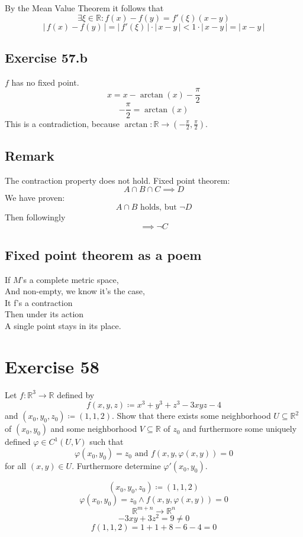 \documentclass[a4paper]{article}
\theoremstyle{definition}
\newcommand\abs[1]{\left|\,#1\,\right|}
\begin{document}
By the Mean Value Theorem it follows that
\[ \exists \xi \in \mathbb R: f(x) - f(y) = f'(\xi) (x - y) \]
\[ \abs{f(x) - f(y)} = \abs{f'(\xi)} \cdot \abs{x - y} < 1 \cdot \abs{x - y} = \abs{x - y} \]

\subsection{Exercise 57.b}

$f$ has no fixed point.
\[ x = x - \arctan(x) - \frac\pi2 \]
\[ -\frac\pi2 = \arctan(x) \]
This is a contradiction, because $\arctan: \mathbb R \to (-\frac{\pi}{2}, \frac\pi2)$.

\subsection{Remark}
%
The contraction property does not hold. Fixed point theorem:
\[ A \cap B \cap C \implies D \]
We have proven:
\[ A \cap B \text{ holds, but } \neg D \]
Then followingly
\[ \implies \neg C \]

\subsection{Fixed point theorem as a poem}

If $M$'s a complete metric space, \\
And non-empty, we know it's the case, \\
It f's a contraction \\
Then under its action \\
A single point stays in its place.

\section{Exercise 58}
\begin{ex}
  Let $f: \mathbb R^3 \to \mathbb R$ defined by
  \[ f(x, y, z) \coloneqq x^3 + y^3 + z^3 - 3xyz - 4 \]
  and $(x_0, y_0, z_0) \coloneqq (1, 1, 2)$. Show that there exists some neighborhood
  $U \subseteq \mathbb R^2$ of $(x_0, y_0)$ and some neighborhood $V \subseteq \mathbb R$
  of $z_0$ and furthermore some uniquely defined $\varphi \in C^1(U, V)$ such that
  \[ \varphi(x_0, y_0) = z_0 \text{ and } f(x, y, \varphi(x, y)) = 0 \]
  for all $(x, y) \in U$. Furthermore determine $\varphi'(x_0, y_0)$.
\end{ex}

\[ (x_0, y_0, z_0) \coloneqq (1, 1, 2) \]
\[ \varphi(x_0, y_0) = z_0 \land f(x, y, \varphi(x, y)) = 0 \]
\[ \mathbb R^{m+n} \to \mathbb R^n \]
\[ - 3xy + 3z^2 = 9 \neq 0 \]
\[ f(1, 1, 2) = 1 + 1 + 8 - 6 - 4 = 0 \]
\end{document}
